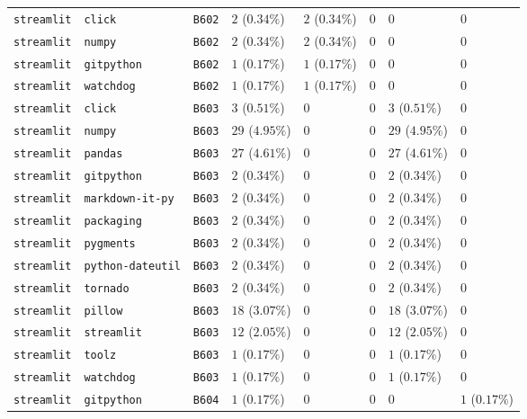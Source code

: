 \begin{table}
\begin{tabular}{llllllll}
\texttt{streamlit} & \texttt{click} & \texttt{B602} & $2$ ($0.34\%$) & $2$ ($0.34\%$) & $0$ & $0$ & $0$ \\
\texttt{streamlit} & \texttt{numpy} & \texttt{B602} & $2$ ($0.34\%$) & $2$ ($0.34\%$) & $0$ & $0$ & $0$ \\
\texttt{streamlit} & \texttt{gitpython} & \texttt{B602} & $1$ ($0.17\%$) & $1$ ($0.17\%$) & $0$ & $0$ & $0$ \\
\texttt{streamlit} & \texttt{watchdog} & \texttt{B602} & $1$ ($0.17\%$) & $1$ ($0.17\%$) & $0$ & $0$ & $0$ \\
\texttt{streamlit} & \texttt{click} & \texttt{B603} & $3$ ($0.51\%$) & $0$ & $0$ & $3$ ($0.51\%$) & $0$ \\
\texttt{streamlit} & \texttt{numpy} & \texttt{B603} & $29$ ($4.95\%$) & $0$ & $0$ & $29$ ($4.95\%$) & $0$ \\
\texttt{streamlit} & \texttt{pandas} & \texttt{B603} & $27$ ($4.61\%$) & $0$ & $0$ & $27$ ($4.61\%$) & $0$ \\
\texttt{streamlit} & \texttt{gitpython} & \texttt{B603} & $2$ ($0.34\%$) & $0$ & $0$ & $2$ ($0.34\%$) & $0$ \\
\texttt{streamlit} & \texttt{markdown-it-py} & \texttt{B603} & $2$ ($0.34\%$) & $0$ & $0$ & $2$ ($0.34\%$) & $0$ \\
\texttt{streamlit} & \texttt{packaging} & \texttt{B603} & $2$ ($0.34\%$) & $0$ & $0$ & $2$ ($0.34\%$) & $0$ \\
\texttt{streamlit} & \texttt{pygments} & \texttt{B603} & $2$ ($0.34\%$) & $0$ & $0$ & $2$ ($0.34\%$) & $0$ \\
\texttt{streamlit} & \texttt{python-dateutil} & \texttt{B603} & $2$ ($0.34\%$) & $0$ & $0$ & $2$ ($0.34\%$) & $0$ \\
\texttt{streamlit} & \texttt{tornado} & \texttt{B603} & $2$ ($0.34\%$) & $0$ & $0$ & $2$ ($0.34\%$) & $0$ \\
\texttt{streamlit} & \texttt{pillow} & \texttt{B603} & $18$ ($3.07\%$) & $0$ & $0$ & $18$ ($3.07\%$) & $0$ \\
\texttt{streamlit} & \texttt{streamlit} & \texttt{B603} & $12$ ($2.05\%$) & $0$ & $0$ & $12$ ($2.05\%$) & $0$ \\
\texttt{streamlit} & \texttt{toolz} & \texttt{B603} & $1$ ($0.17\%$) & $0$ & $0$ & $1$ ($0.17\%$) & $0$ \\
\texttt{streamlit} & \texttt{watchdog} & \texttt{B603} & $1$ ($0.17\%$) & $0$ & $0$ & $1$ ($0.17\%$) & $0$ \\
\texttt{streamlit} & \texttt{gitpython} & \texttt{B604} & $1$ ($0.17\%$) & $0$ & $0$ & $0$ & $1$ ($0.17\%$) \\

\end{tabular}
\end{table}
